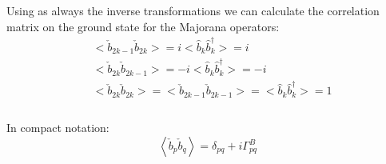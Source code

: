 \documentclass[12pt,a4paper]{book}
\theoremstyle{definition}
\begin{document}
Using as always the inverse transformations we can calculate the correlation matrix on the ground state for the Majorana operators:
\begin{equation}\begin{split}
		&<\check{b}_{2k-1}\check{b}_{2k}>=i<\hat{b}_k\hat{b}_k^\dagger>=i\\ &<\check{b}_{2k}\check{b}_{2k-1}>=-i<\hat{b}_k\hat{b}_k^\dagger>=-i \\&<\check{b}_{2k}\check{b}_{2k}>=<\check{b}_{2k-1}\check{b}_{2k-1}>=<\hat{b}_k\hat{b}_k^\dagger>=1\\
	\end{split}
\end{equation}\\
In compact notation:
\begin{equation}
	\left\langle\check{b}_{p} \check{b}_{q}\right\rangle=\delta_{p q}+i \Gamma_{p q}^{B}
\end{equation}
\end{document}
